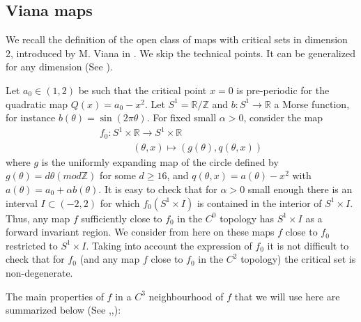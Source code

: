 \documentclass[12pt,a4paper]{amsart}
\theoremstyle{plain}
\begin{document}
\subsection{Viana maps} We recall the definition of the open class of maps with critical sets in dimension 2, introduced by M. Viana in \cite{V}. We skip the technical
points. It can be generalized for any dimension (See \cite{A}).

Let $a_{0} \in (1,2)$ be such that the critical point $x=0$ is pre-periodic for the quadratic map $Q(x)=a_{0} - x^{2}$. Let $S^{1}=\mathbb{R}/\mathbb{Z}$ and 
$b:S^{1} \to \mathbb{R}$ a Morse function, for instance $b(\theta) = \sin(2\pi\theta)$. For fixed small $\alpha > 0$, consider the map
\[
\begin{array}{c}
	f_{0}: S^{1} \times \mathbb{R} \longrightarrow S^{1} \times \mathbb{R}\\
	\,\,\,\,\,\,\,\,\,\,\,\,\,\,\,\,\,\,\,\ (\theta,x) \longmapsto (g(\theta),q(\theta,x))
\end{array}
\] 
where $g$ is the uniformly expanding map of the circle defined by $g(\theta)=d\theta
(mod\mathbb{Z})$ for some $d \geq 16$, and $q(\theta,x) = a(\theta) - x^{2}$ with $a(\theta) = a_{0} + \alpha b(\theta)$. It is easy to check that for $\alpha > 0$ 
small enough there is an interval $I \subset (-2,2)$ for which $f_{0}(S^{1} \times I)$ is contained in the interior of $S^{1} \times I$. Thus, any map $f$ sufficiently
close to $f_{0}$ in the $C^{0}$ topology has $S^{1} \times I$ as a forward invariant region. We consider from here on these maps $f$ close to $f_{0}$ restricted to 
$S^{1} \times I$. Taking into account the expression of $f_{0}$ it is not difficult to check that for $f_{0}$ (and any map $f$ close to $f_{0}$ in the $C^{2}$ topology)
the critical set is non-degenerate.

The main properties of $f$ in a $C^{3}$ neighbourhood of $f$ that we will use here are summarized below (See \cite{A},\cite{AV},\cite{Pi1}):
\end{document}
